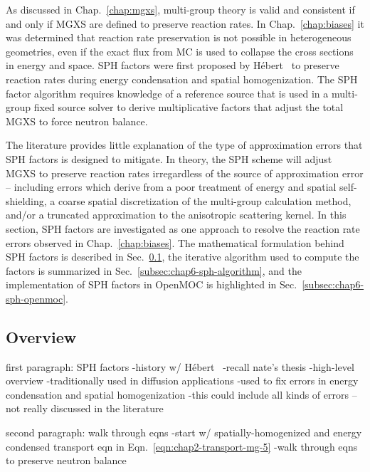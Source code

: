 As discussed in Chap.~\ref{chap:mgxs}, multi-group theory is valid and consistent if and only if \ac{MGXS} are defined to preserve reaction rates. In Chap.~\ref{chap:biases} it was determined that reaction rate preservation is not possible in heterogeneous geometries, even if the exact flux from \ac{MC} is used to collapse the cross sections in energy and space. \ac{SPH} factors were first proposed by H\'{e}bert~\cite{hebert1993consistent} to preserve reaction rates during energy condensation and spatial homogenization. The \ac{SPH} factor algorithm requires knowledge of a reference source that is used in a multi-group fixed source solver to derive multiplicative factors that adjust the total \ac{MGXS} to force neutron balance. 

The literature provides little explanation of the type of approximation errors that \ac{SPH} factors is designed to mitigate. In theory, the \ac{SPH} scheme will adjust \ac{MGXS} to preserve reaction rates irregardless of the source of approximation error -- including errors which derive from a poor treatment of energy and spatial self-shielding, a coarse spatial discretization of the multi-group calculation method, and/or a truncated approximation to the anisotropic scattering kernel. In this section, \ac{SPH} factors are investigated as one approach to resolve the reaction rate errors observed in Chap.~\ref{chap:biases}. The mathematical formulation behind \ac{SPH} factors is described in Sec.~\ref{subsec:chap6-sph-overview}, the iterative algorithm used to compute the factors is summarized in Sec.~\ref{subsec:chap6-sph-algorithm}, and the implementation of \ac{SPH} factors in OpenMOC is highlighted in Sec.~\ref{subsec:chap6-sph-openmoc}.

\subsection{Overview}
\label{subsec:chap6-sph-overview}

first paragraph: SPH factors
-history w/ H\'{e}bert~\cite{hebert1993consistent}\cite{hebert2005ribon}
-recall nate's thesis
-high-level overview
-traditionally used in diffusion applications
-used to fix errors in energy condensation and spatial homogenization
  -this could include all kinds of errors -- not really discussed in the literature

second paragraph: walk through eqns
-start w/ spatially-homogenized and energy condensed transport eqn in Eqn.~\ref{eqn:chap2-transport-mg-5}
-walk through eqns to preserve neutron balance

